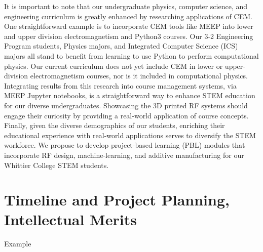 \documentclass[../../main.tex]{subfiles}
\begin{document}
It is important to note that our undergraduate physics, computer science, and engineering curriculum is greatly enhanced by researching applications of CEM.  One straightforward example is to incorporate CEM tools like MEEP into lower and upper division electromagnetism and Python3 courses.  Our 3-2 Engineering Program students, Physics majors, and Integrated Computer Science (ICS) majors all stand to benefit from learning to use Python to perform computational physics.  Our current curriculum does not yet include CEM in lower or upper-division electromagnetism courses, nor is it included in computational physics.  Integrating results from this research into course management systems, via MEEP Jupyter notebooks, is a straightforward way to enhance STEM education for our diverse undergraduates.  Showcasing the 3D printed RF systems should engage their curiosity by providing a real-world application of course concepts.  Finally, given the diverse demographics of our students, enriching their educational experience with real-world applications serves to diversify the STEM workforce.  We propose to develop project-based learning (PBL) modules that incorporate RF design, machine-learning, and additive manufacturing for our Whittier College STEM students.  \\ \vspace{2.5mm}

\section{Timeline and Project Planning, Intellectual Merits}
\label{sec:time_im}

Example
\end{document}
